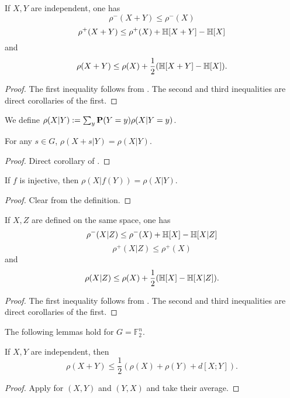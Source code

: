 \begin{lemma}\label{rho-sums}  If $X,Y$ are independent, one has
  $$ \rho^-(X+Y) \leq \rho^-(X)$$
  $$ \rho^+(X+Y) \leq \rho^+(X) + \mathbb{H}[X+Y] - \mathbb{H}[X]$$
and
  $$ \rho(X+Y) \leq \rho(X) + \frac{1}{2}( \mathbb{H}[X+Y] - \mathbb{H}[X] ).$$
\end{lemma}

\begin{proof}
The first inequality follows from . The second and third inequalities are direct corollaries of the first. 
\end{proof}


\begin{definition}\label{rho-cond-def}  We define $\rho(X|Y) := \sum_y {\bf P}(Y=y) \rho(X|Y=y)$.
\end{definition}

\begin{lemma}\label{rho-cond-invariant}
  For any $s\in G$, $\rho(X+s|Y)=\rho(X|Y)$.
\end{lemma}
\begin{proof}
  Direct corollary of .
\end{proof}

\begin{lemma}\label{rho-cond-relabeled}
  If $f$ is injective, then $\rho(X|f(Y))=\rho(X|Y)$.
\end{lemma}
\begin{proof}
  Clear from the definition.
\end{proof}

\begin{lemma}\label{rho-cond}  If $X,Z$ are defined on the same space, one has
  $$ \rho^-(X|Z) \leq \rho^-(X) + \mathbb{H}[X] - \mathbb{H}[X|Z]$$
  $$ \rho^+(X|Z) \leq \rho^+(X)$$
and
  $$ \rho(X|Z) \leq \rho(X) + \frac{1}{2}( \mathbb{H}[X] - \mathbb{H}[X|Z] ).$$
\end{lemma}

\begin{proof}
  The first inequality follows from . The second and third inequalities are direct corollaries of the first. 
\end{proof}

The following lemmas hold for $G=\mathbb{F}_2^n$.

\begin{lemma}\label{rho-sums-sym}  If $X,Y$ are independent, then
  $$ \rho(X+Y) \leq \frac{1}{2}(\rho(X)+\rho(Y) + d[X;Y]).$$
\end{lemma}
\begin{proof}
Apply  for $(X,Y)$ and $(Y,X)$ and take their average.
\end{proof}


